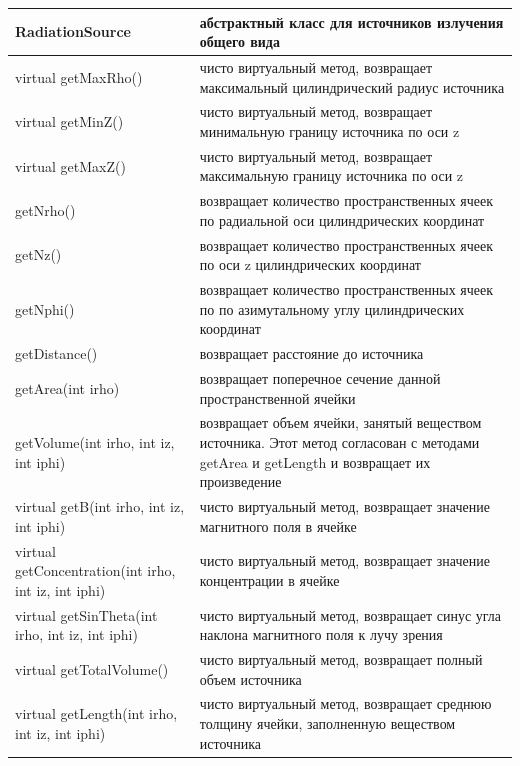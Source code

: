 \begin{small}
	\label{sourceMethods1}
	\begin{xtabular}{|p{0.5\textwidth}|p{0.5\textwidth}|}
		\hline
		\textbf{RadiationSource} & абстрактный класс для источников излучения общего вида\\
		\hline
		virtual getMaxRho() & чисто виртуальный метод, возвращает максимальный цилиндрический радиус источника\\
		\hline
		virtual getMinZ() & чисто виртуальный метод, возвращает минимальную границу источника по оси z\\
		\hline
		virtual getMaxZ() & чисто виртуальный метод, возвращает максимальную границу источника по оси z\\
		\hline
		getNrho() & возвращает количество пространственных ячеек по радиальной оси цилиндрических координат\\
		\hline
		getNz() & возвращает количество пространственных ячеек по оси z цилиндрических координат\\
		\hline
		getNphi() & возвращает количество пространственных ячеек по по азимутальному углу цилиндрических координат\\
		\hline
		getDistance() & возвращает расстояние до источника\\
		\hline
		getArea(int irho) & возвращает поперечное сечение данной пространственной ячейки\\
		\hline
		getVolume(int irho, int iz, int iphi) & возвращает объем ячейки, занятый веществом источника. Этот метод согласован с методами getArea и getLength и возвращает их произведение\\
		\hline
		virtual getB(int irho, int iz, int iphi) & чисто виртуальный метод, возвращает значение магнитного поля в ячейке\\
		\hline
		virtual getConcentration(int irho, int iz, int iphi) & чисто виртуальный метод, возвращает значение концентрации в ячейке \\
		\hline
		virtual getSinTheta(int irho, int iz, int iphi) & чисто виртуальный метод, возвращает синус угла наклона магнитного поля к лучу зрения\\
		\hline
		virtual getTotalVolume() & чисто виртуальный метод, возвращает полный объем источника\\
		\hline
		virtual getLength(int irho, int iz, int iphi) & чисто виртуальный метод, возвращает среднюю толщину ячейки, заполненную веществом источника\\

\end{xtabular}
\end{small}
